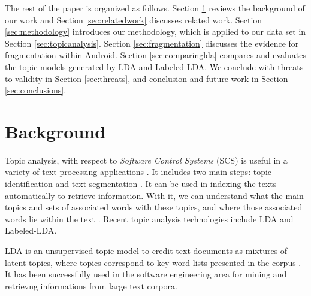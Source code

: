 \documentclass[10pt, conference, compsocconf]{IEEEtran}
\begin{document}
The rest of the paper is organized as follows. Section \ref{sec:background} reviews the
background of our work and Section \ref{sec:relatedwork} discusses related work. Section \ref{sec:methodology}
introduces our methodology, which is applied to our data set in
Section \ref{sec:topicanalysis}. Section \ref{sec:fragmentation}
discusses the evidence for fragmentation within Android. Section \ref{sec:comparinglda} compares and evaluates the topic models generated
by LDA and Labeled-LDA. 
We conclude with threats to validity in Section \ref{sec:threats},
and conclusion and future work in
Section \ref{sec:conclusions}.





\section{Background}
\label{sec:background}


Topic analysis, with respect to {\em Software Control Systems} (SCS) is useful in a variety of text processing applications \cite{hindle9s}. It includes two main steps: topic identification and text segmentation \cite{li2003topic}. It can be used in indexing the texts automatically to retrieve information.
With it, we can understand what the main topics and sets of associated words with these topics, and where those associated words lie within the text \cite{li2003topic}. Recent topic analysis technologies include LDA and Labeled-LDA.

LDA is an unsupervised topic model to credit text documents as mixtures of latent topics, where topics correspond to key word lists presented in the corpus \cite{ldawiki}. It has been successfully used in the software engineering area for mining and retrievng informations from large text corpora.
\end{document}
